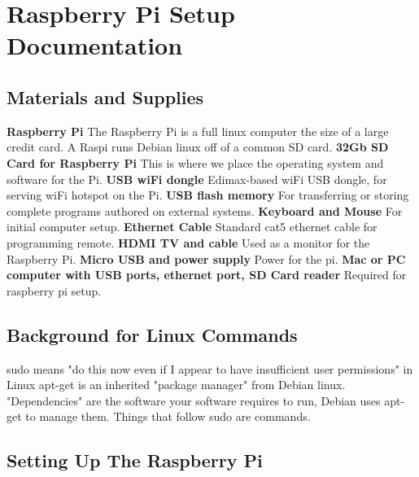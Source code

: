 
\chapter{Raspberry Pi Setup Documentation} %

\label{AppendixC} %


 
\section{Materials and Supplies}
\textbf{Raspberry Pi}
The Raspberry Pi is a full linux computer the size of a large credit card. A Raspi runs Debian linux off of a common SD card.
\textbf{32Gb SD Card for Raspberry Pi}
This is where we place the operating system and software for the Pi.
\textbf{USB wiFi dongle}
Edimax-based wiFi USB dongle, for serving wiFi hotspot on the Pi.
\textbf{USB flash memory}
For transferring or storing complete programs authored on external systems.
\textbf{Keyboard and Mouse}
For initial computer setup.
\textbf{Ethernet Cable}
Standard cat5 ethernet cable for programming remote.
\textbf{HDMI TV and cable}
Used as a monitor for the Raspberry Pi.
\textbf{Micro USB and power supply}
Power for the pi.
\textbf{Mac or PC computer with USB ports, ethernet port, SD Card reader}
Required for raspberry pi setup.

\section{Background for Linux Commands}
sudo means "do this now even if I appear to have insufficient user permissions" in Linux 
apt-get is an inherited "package manager" from Debian linux. "Dependencies" are the software your software requires to run, Debian uses apt-get to manage them.
Things that follow sudo are commands.

\section{Setting Up The Raspberry Pi}
